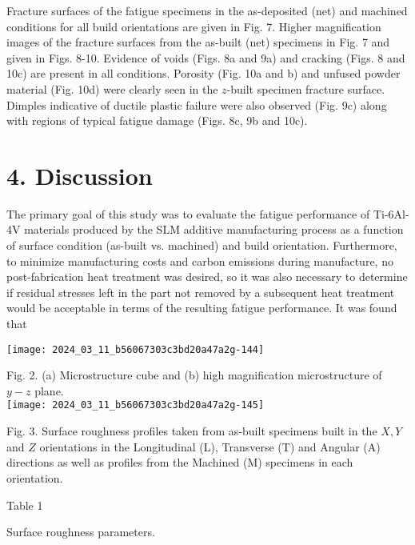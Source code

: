 \documentclass[10pt]{article}
\begin{document}
Fracture surfaces of the fatigue specimens in the as-deposited (net) and machined conditions for all build orientations are given in Fig. 7. Higher magnification images of the fracture surfaces from the as-built (net) specimens in Fig. 7 and given in Figs. 8-10. Evidence of voids (Figs. 8a and 9a) and cracking (Figs. 8 and 10c) are present in all conditions. Porosity (Fig. 10a and b) and unfused powder material (Fig. 10d) were clearly seen in the $z$-built specimen fracture surface. Dimples indicative of ductile plastic failure were also observed (Fig. 9c) along with regions of typical fatigue damage (Figs. 8c, 9b and 10c).

\section*{4. Discussion}
The primary goal of this study was to evaluate the fatigue performance of Ti-6Al-4V materials produced by the SLM additive manufacturing process as a function of surface condition (as-built vs. machined) and build orientation. Furthermore, to minimize manufacturing costs and carbon emissions during manufacture, no post-fabrication heat treatment was desired, so it was also necessary to determine if residual stresses left in the part not removed by a subsequent heat treatment would be acceptable in terms of the resulting fatigue performance. It was found that

\begin{center}
\texttt{[image: 2024\_03\_11\_b56067303c3bd20a47a2g-144]}
\end{center}

Fig. 2. (a) Microstructure cube and (b) high magnification microstructure of $y-z$ plane.\\
\texttt{[image: 2024\_03\_11\_b56067303c3bd20a47a2g-145]}

Fig. 3. Surface roughness profiles taken from as-built specimens built in the $X, Y$ and $Z$ orientations in the Longitudinal (L), Transverse (T) and Angular (A) directions as well as profiles from the Machined (M) specimens in each orientation.

Table 1

Surface roughness parameters.
\end{document}
